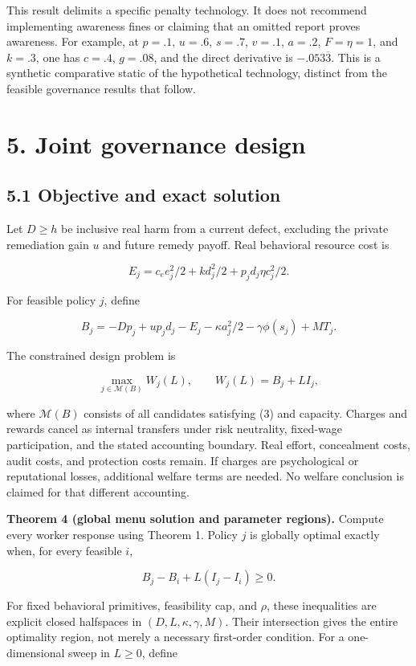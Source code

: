 \documentclass[
  11pt,
]{article}
\begin{document}
This result delimits a specific penalty technology. It does not
recommend implementing awareness fines or claiming that an omitted
report proves awareness. For example, at \(p=.1\), \(u=.6\), \(s=.7\),
\(v=.1\), \(a=.2\), \(F=\eta=1\), and \(k=.3\), one has \(c=.4\),
\(g=.08\), and the direct derivative is \(-.053\overline3\). This is a
synthetic comparative static of the hypothetical technology, distinct
from the feasible governance results that follow.

\section{5. Joint governance design}\label{joint-governance-design}

\subsection{5.1 Objective and exact
solution}\label{objective-and-exact-solution}

Let \(D\geq h\) be inclusive real harm from a current defect, excluding
the private remediation gain \(u\) and future remedy payoff. Real
behavioral resource cost is

\[E_j=c_e e_j^2/2+kd_j^2/2+p_jd_j\eta c_j^2/2.\]

For feasible policy \(j\), define

\[B_j=-Dp_j+up_jd_j-E_j-\kappa a_j^2/2-\gamma\phi(s_j)+MT_j.\]

The constrained design problem is

\[\max_{j\in\mathcal M(B)} W_j(L),\qquad W_j(L)=B_j+LI_j, \tag{14}\]

where \(\mathcal M(B)\) consists of all candidates satisfying (3) and
capacity. Charges and rewards cancel as internal transfers under risk
neutrality, fixed-wage participation, and the stated accounting
boundary. Real effort, concealment costs, audit costs, and protection
costs remain. If charges are psychological or reputational losses,
additional welfare terms are needed. No welfare conclusion is claimed
for that different accounting.

\textbf{Theorem 4 (global menu solution and parameter regions).} Compute
every worker response using Theorem 1. Policy \(j\) is globally optimal
exactly when, for every feasible \(i\),

\[B_j-B_i+L(I_j-I_i)\geq0. \tag{15}\]

For fixed behavioral primitives, feasibility cap, and \(\rho\), these
inequalities are explicit closed halfspaces in
\((D,L,\kappa,\gamma,M)\). Their intersection gives the entire
optimality region, not merely a necessary first-order condition. For a
one-dimensional sweep in \(L\geq0\), define
\end{document}
